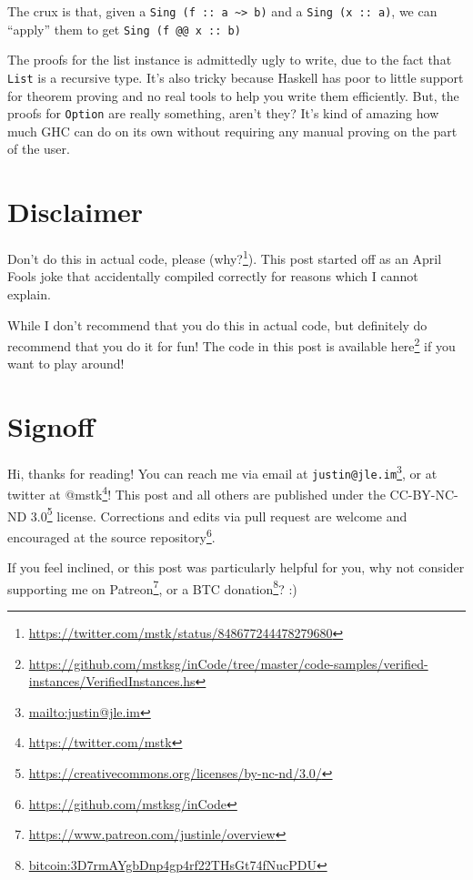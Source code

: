 \documentclass[]{article}
\renewcommand{\href}[2]{#2\footnote{\url{#1}}}
\begin{document}
The crux is that, given a
\texttt{Sing\ (f\ ::\ a\ \textasciitilde{}\textgreater{}\ b)} and a
\texttt{Sing\ (x\ ::\ a)}, we can ``apply'' them to get
\texttt{Sing\ (f\ @@\ x\ ::\ b)}

The proofs for the list instance is admittedly ugly to write, due to the fact
that \texttt{List} is a recursive type. It's also tricky because Haskell has
poor to little support for theorem proving and no real tools to help you write
them efficiently. But, the proofs for \texttt{Option} are really something,
aren't they? It's kind of amazing how much GHC can do on its own without
requiring any manual proving on the part of the user.

\section{Disclaimer}\label{disclaimer}

Don't do this in actual code, please
(\href{https://twitter.com/mstk/status/848677244478279680}{why?}). This post
started off as an April Fools joke that accidentally compiled correctly for
reasons which I cannot explain.

While I don't recommend that you do this in actual code, but definitely do
recommend that you do it for fun! The code in this post is available
\href{https://github.com/mstksg/inCode/tree/master/code-samples/verified-instances/VerifiedInstances.hs}{here}
if you want to play around!

\section{Signoff}\label{signoff}

Hi, thanks for reading! You can reach me via email at
\href{mailto:justin@jle.im}{\nolinkurl{justin@jle.im}}, or at twitter at
\href{https://twitter.com/mstk}{@mstk}! This post and all others are published
under the \href{https://creativecommons.org/licenses/by-nc-nd/3.0/}{CC-BY-NC-ND
3.0} license. Corrections and edits via pull request are welcome and encouraged
at \href{https://github.com/mstksg/inCode}{the source repository}.

If you feel inclined, or this post was particularly helpful for you, why not
consider \href{https://www.patreon.com/justinle/overview}{supporting me on
Patreon}, or a \href{bitcoin:3D7rmAYgbDnp4gp4rf22THsGt74fNucPDU}{BTC donation}?
:)
\end{document}
